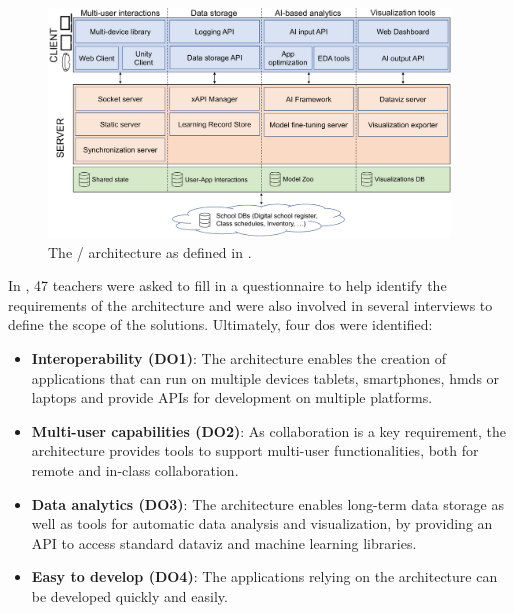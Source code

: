 \documentclass[pdflatex,sn-basic,iicol]{sn-jnl}%
\begin{document}
\begin{figure}[htp!]
    \centering
    \includegraphics[width=0.95\textwidth]{imgs/arch_diagram_revised.pdf}
    \caption{The \clear/ architecture as defined in \citep{Masneri2023}.}
    \label{fig:clear}
\end{figure}

In \cite{Masneri2023}, 47 teachers were asked to fill in a questionnaire to help identify the requirements of the architecture and were also involved in several interviews to define the scope of the solutions. Ultimately, four \glspl{do} were identified:
\begin{itemize}
 \item \textbf{Interoperability (DO1)}: The architecture enables the creation of applications that can run on multiple devices \textendash{} tablets, smartphones, \glspl{hmd} or laptops \textendash{} and provide APIs for development on multiple platforms.
 \item \textbf{Multi-user capabilities (DO2)}: As collaboration is a key requirement, the architecture provides tools to support multi-user functionalities, both for remote and in-class collaboration.
 \item \textbf{Data analytics (DO3)}: The architecture enables long-term data storage as well as tools for automatic data analysis and visualization, by providing an API to access standard dataviz and machine learning libraries.
 \item \textbf{Easy to develop (DO4)}: The applications relying on the architecture can be developed quickly and easily.
 \end{itemize}
 
\end{document}
